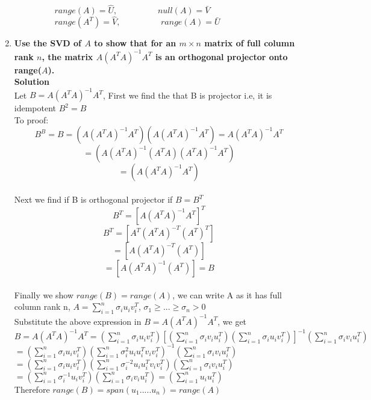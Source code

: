 \documentclass[12pt, oneside]{article}   	%
\begin{document}
\begin{enumerate}
	$\hspace{2cm}range(A)=\hat{U},  \hspace{2cm} null(A)=\bar{V}$\\
	
	$\hspace{2cm}range(A^T)=\hat{V}, \hspace{2cm} range(A)=\bar{U}$\\
	
	\item \textbf{Use the SVD of $A$ to show that for an $m \times n$ matrix of full column rank $n$, the matrix $A (A^TA)^{-1} A^T$ is an orthogonal
	projector onto range($A$).}\\
	
	\textbf{Solution}\\
	Let $B= A (A^TA)^{-1} A^T$, 
	First we find the that B is projector i.e, it is idempotent $B^2=B$\\
	
	To proof:\\
	
	$$B^B=B=(A (A^TA)^{-1} A^T)(A (A^TA)^{-1} A^T)= A (A^TA)^{-1} A^T$$
	$$=(A (A^TA)^{-1} (A^TA) (A^TA)^{-1} A^T)$$
	$$=(A  (A^TA)^{-1} A^T)$$\\
	
	Next we find if B is orthogonal projector if $B=B^T$\\
		$$B^T=[A  (A^TA)^{-1} A^T]^T$$
		$$B^T=[A^T (A^TA)^{-T} (A^T)^T]$$
		$$=[A (A^TA)^{-T} (A^T)]$$
		$$=[A (A^TA)^{-1} (A^T)]= B$$\\
	Finally we show $range(B)=range(A)$, we can write A as it has full column rank n, $A= \sum_{i=1}^{n} \sigma_i u_i v_i^T$, $\sigma_1 \geq... \geq \sigma_n > 0 $\\
	Substitute the above expression in $B= A (A^TA)^{-1} A^T$, we get\\
	
	$B= A (A^TA)^{-1} A^T= (\sum_{i=1}^{n} \sigma_i u_i v_i^T)[(\sum_{i=1}^{n} \sigma_i v_i u_i^T)(\sum_{i=1}^{n} \sigma_i u_i v_i^T)]^{-1}(\sum_{i=1}^{n} \sigma_i v_i u_i^T)$\\
	
	$=(\sum_{i=1}^{n} \sigma_i u_i v_i^T)(\sum_{i=1}^{n} \sigma_i^2 u_i u_i^T v_i v_i^T)^{-1}(\sum_{i=1}^{n} \sigma_i v_i u_i^T)$\\
	
	$=(\sum_{i=1}^{n} \sigma_i u_i v_i^T)(\sum_{i=1}^{n} \sigma_i^{-2} u_i u_i^T v_i v_i^T)(\sum_{i=1}^{n} \sigma_i v_i u_i^T)$\\
	
	$=(\sum_{i=1}^{n} \sigma_i^{-1} u_i v_i^T)(\sum_{i=1}^{n} \sigma_i v_i u_i^T)=(\sum_{i=1}^{n}  u_i u_i^T) $\\
	
	Therefore $range(B)=span(u_1.....u_n)= range(A)$\\
	
\end{enumerate}
\end{document}

